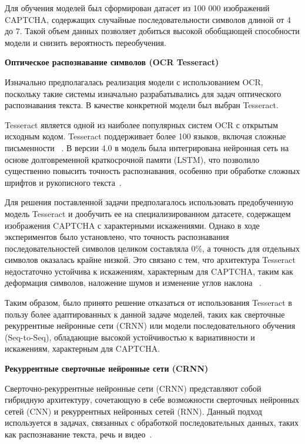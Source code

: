 Для обучения моделей был сформирован датасет из 100 000 изображений CAPTCHA, 
содержащих случайные последовательности символов длиной от 4 до 7. Такой объем 
данных позволяет добиться высокой обобщающей способности модели и снизить 
вероятность переобучения.

\textbf{Оптическое распознавание символов (OCR Tesseract)}

Изначально предполагалась реализация модели с использованием OCR, поскольку такие 
системы изначально разрабатывались для задач оптического распознавания текста. В 
качестве конкретной модели был выбран Tesseract.

Tesseract является одной из наиболее популярных систем OCR с открытым исходным 
кодом. Tesseract поддерживает более 100 языков, включая сложные письменности~
\cite{Klippa}. В версии 4.0 в модель была интегрирована нейронная сеть на основе 
долговременной краткосрочной памяти (LSTM), что позволило существенно повысить 
точность распознавания, особенно при обработке сложных шрифтов и рукописного 
текста~\cite{GitTesseract}.

Для решения поставленной задачи предполагалось использовать предобученную модель 
Tesseract и дообучить ее на специализированном датасете, содержащем изображения 
CAPTCHA с характерными искажениями. Однако в ходе экспериментов было установлено, 
что точность распознавания последовательностей символов целиком составляла 0\%, а 
точность для отдельных символов оказалась крайне низкой. Это связано с тем, что 
архитектура Tesseract недостаточно устойчива к искажениям, характерным для 
CAPTCHA, таким как деформация символов, наложение шумов и изменение углов наклона
~\cite{TrainTesseract}.

Таким образом, было принято решение отказаться от использования Tesseract в 
пользу более адаптированных к данной задаче моделей, таких как сверточные 
рекуррентные нейронные сети (CRNN) или модели последовательного обучения 
(Seq-to-Seq), обладающие высокой устойчивостью к вариативности и искажениям, 
характерным для CAPTCHA.

\textbf{Рекуррентные сверточные нейронные сети (CRNN)}

Сверточно-рекуррентные нейронные сети (CRNN) представляют собой гибридную 
архитектуру, сочетающую в себе возможности сверточных нейронных сетей (CNN) и 
рекуррентных нейронных сетей (RNN). Данный подход используется в задачах, 
связанных с обработкой последовательных данных, таких как распознавание текста, 
речь и видео~\cite{CRNNHabr}.

